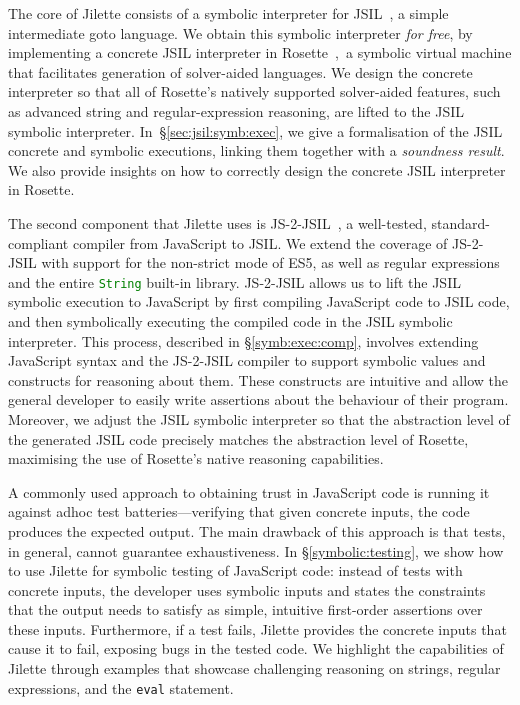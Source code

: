 \documentclass[a4paper,UKenglish]{lipics-v2016}
\def\jsinline{\lstinline[language=JavaScript, basicstyle=\small]}
\newcommand{\jsil}{JSIL\xspace}
\newcommand{\JSComp}{JS-2-JSIL\xspace}
\newcommand{\jilette}{Jilette\xspace}
\newcommand{\myparagraph}[1]{\smallskip\noindent {\bf #1.}\hspace{1pt}}
\begin{document}
\myparagraph{Architecture}
The core of \jilette consists of a symbolic interpreter for
\jsil~\cite{javert}, a simple intermediate goto language. 
We obtain this symbolic interpreter \emph{for free}, 
by implementing a concrete \jsil interpreter in Rosette~\cite{Rosette2,Rosette1},~a 
symbolic virtual machine that facilitates generation of solver-aided languages.
We design the concrete interpreter so that all of Rosette's natively supported solver-aided
features, such as advanced string and regular-expression reasoning, 
are lifted to the \jsil symbolic interpreter. 
In~\S\ref{sec:jsil:symb:exec}, we give a formalisation of the \jsil concrete and symbolic executions, linking them together with a {\em soundness result}. We also provide  insights on how to correctly design the concrete \jsil interpreter in Rosette.

The second component that \jilette uses is \JSComp~\cite{javert}, 
a well-tested, standard-compliant compiler from JavaScript to \jsil. We extend
the coverage of \JSComp with support for the non-strict mode of ES5, as well as
regular expressions and the entire \jsinline|String| built-in library.
\JSComp allows us to lift the \jsil symbolic execution to JavaScript by first compiling JavaScript code to \jsil code, and
then symbolically executing the compiled code in the 
\jsil symbolic interpreter. This process, described in \S\ref{symb:exec:comp},
involves extending JavaScript syntax and the \JSComp compiler to support symbolic values and 
constructs for reasoning about them. These constructs are intuitive
and allow the general developer to easily write assertions about the behaviour
of their program. 
Moreover, we adjust the \jsil symbolic interpreter so that the abstraction level 
of the generated \jsil code precisely matches the abstraction level of Rosette, 
 maximising the use of Rosette's native reasoning capabilities.





\myparagraph{Application: Symbolic Testing} A commonly used 
approach to obtaining trust in JavaScript code is running it against 
adhoc test batteries---verifying that given concrete inputs, the code produces the expected
output. The main drawback of this approach is that tests, in general,
cannot guarantee exhaustiveness. %
In \S\ref{symbolic:testing}, we show how to use \jilette
for symbolic testing of JavaScript code: instead of 
tests with concrete 
inputs, the developer uses symbolic inputs and states the 
constraints that the output needs to satisfy as simple, intuitive 
first-order assertions over these inputs. 
Furthermore, if a test fails, Jilette provides the concrete inputs that cause it 
to fail, exposing bugs in the tested code. 
We highlight the capabilities of \jilette through examples that showcase
challenging reasoning on strings, regular expressions, and the \jsinline|eval|
statement.
\end{document}
